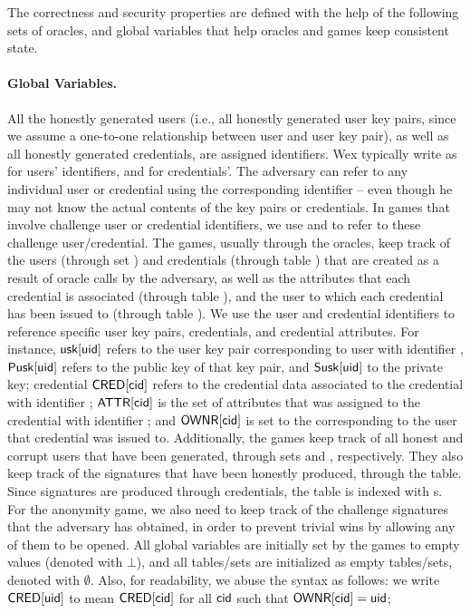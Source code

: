 The correctness and security properties are defined with the help of the
following sets of oracles, and global variables that help oracles and games
keep consistent state.

\paragraph{Global Variables.} %
All the honestly generated users (i.e., all honestly generated user key pairs,
since we assume a one-to-one relationship between user and user key pair), as
well as all honestly generated credentials, are assigned identifiers. Wex
typically write as \uid for users' identifiers, and \cid for credentials'. The
adversary can
refer to any individual user or credential using the corresponding identifier --
even though he may not know the actual contents of the key pairs or credentials.
In games that involve challenge user or credential identifiers, we use \cuid and
\ccid to refer to these challenge user/credential.
%
The games, usually through the oracles, keep track of the users (through
set \USK) and credentials (through table \CRED) that are created as a result of
oracle calls by the adversary, as well as the attributes that each credential
is associated (through table \ATTR), and the user to which each credential has
been issued to (through table \OWNR). We use the user and credential identifiers
to reference specific user key pairs, credentials, and credential attributes.
For instance, $\USK[\uid]$ refers to the user key pair corresponding to user
with identifier \uid, $\PUBUSK[\uid]$ refers to the public key of that key pair,
and $\PRVUSK[\uid]$ to the private key; credential $\mathsf{CRED}[\mathsf{cid}]$ refers to the
credential data associated to the credential with identifier \cid; $\mathsf{ATTR}[\mathsf{cid}]$
is the set of attributes that was assigned to the credential with identifier
\cid; and $\mathsf{OWNR}[\mathsf{cid}]$ is set to the \uid corresponding to the user that
credential \cid was issued to.
%
Additionally, the games keep track of all honest and corrupt users that have
been generated, through sets \HU and \CU, respectively. They also keep track of
the signatures that have been honestly produced, through the \SIG table. Since
signatures are produced through credentials, the \SIG table is indexed with
{\cid}s. For the anonymity game, we also need to keep track of the challenge
signatures that the adversary has obtained, in order to prevent trivial wins
by allowing any of them to be opened. 
%
All global variables are initially set by the games to empty values (denoted
with $\bot$), and all tables/sets are initialized as empty tables/sets, denoted
with $\emptyset$. Also, for readability, we abuse the syntax as follows: we
write $\mathsf{CRED}[\mathsf{uid}]$ to mean $\mathsf{CRED}[\mathsf{cid}]$ for all $\mathsf{cid}$ such that
$\mathsf{OWNR}[\mathsf{cid}] = \mathsf{uid}$; 

